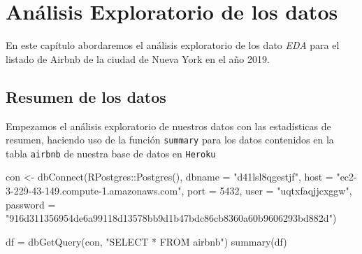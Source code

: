 \documentclass[
]{book}
\newenvironment{Shaded}{\begin{snugshade}}{\end{snugshade}}
\newcommand{\AttributeTok}[1]{\textcolor[rgb]{0.77,0.63,0.00}{#1}}
\newcommand{\DecValTok}[1]{\textcolor[rgb]{0.00,0.00,0.81}{#1}}
\newcommand{\FunctionTok}[1]{\textcolor[rgb]{0.00,0.00,0.00}{#1}}
\newcommand{\NormalTok}[1]{#1}
\newcommand{\OtherTok}[1]{\textcolor[rgb]{0.56,0.35,0.01}{#1}}
\newcommand{\SpecialCharTok}[1]{\textcolor[rgb]{0.00,0.00,0.00}{#1}}
\newcommand{\StringTok}[1]{\textcolor[rgb]{0.31,0.60,0.02}{#1}}
\begin{document}
\hypertarget{anuxe1lisis-exploratorio-de-los-datos}{%
\chapter{Análisis Exploratorio de los datos}\label{anuxe1lisis-exploratorio-de-los-datos}}

En este capítulo abordaremos el análisis exploratorio de los dato \emph{EDA} para el listado de Airbnb de la ciudad de Nueva York en el año 2019.

\hypertarget{resumen-de-los-datos}{%
\section*{Resumen de los datos}\label{resumen-de-los-datos}}

Empezamos el análisis exploratorio de nuestros datos con las estadísticas de resumen, haciendo uso de la función \texttt{summary} para los datos contenidos en la tabla \texttt{airbnb} de nuestra base de datos en \texttt{Heroku}

\begin{Shaded}
\begin{Highlighting}[]
\NormalTok{con }\OtherTok{\textless{}{-}} \FunctionTok{dbConnect}\NormalTok{(RPostgres}\SpecialCharTok{::}\FunctionTok{Postgres}\NormalTok{(), }
                \AttributeTok{dbname =} \StringTok{"d41lsl8qgestjf"}\NormalTok{, }
                \AttributeTok{host =} \StringTok{"ec2{-}3{-}229{-}43{-}149.compute{-}1.amazonaws.com"}\NormalTok{, }
                \AttributeTok{port =} \DecValTok{5432}\NormalTok{, }
                \AttributeTok{user =} \StringTok{"uqtxfaqjjcxggw"}\NormalTok{, }
                \AttributeTok{password =} \StringTok{"916d311356954de6a99118d13578bb9d1b47bdc86cb8360a60b9606293bd882d"}\NormalTok{)}

\NormalTok{df }\OtherTok{=} \FunctionTok{dbGetQuery}\NormalTok{(con, }\StringTok{"SELECT * FROM airbnb"}\NormalTok{)}
\FunctionTok{summary}\NormalTok{(df)}
\end{Highlighting}
\end{Shaded}
\end{document}
